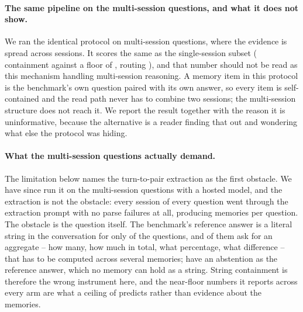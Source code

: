 \documentclass[11pt]{article}
\begin{document}
\paragraph{The same pipeline on the multi-session questions, and what it does not show.}
We ran the identical protocol on \tMultiSessN{} multi-session questions, where the evidence
is spread across sessions. It scores the same as the single-session subset
(\tMultiSessOn{} containment against a floor of \tMultiSessFrozen{}, routing
\tMultiSessRoute{}), and that number should not be read as this mechanism handling
multi-session reasoning. A memory item in this protocol is the benchmark's own question
paired with its own answer, so every item is self-contained and the read path never has to
combine two sessions; the multi-session structure does not reach it. We report the result
together with the reason it is uninformative, because the alternative is a reader finding
that out and wondering what else the protocol was hiding.

\paragraph{What the multi-session questions actually demand.} The limitation below names the
turn-to-pair extraction as the first obstacle. We have since run it on the \tMultiItems{}
multi-session questions with a hosted model, and the extraction is not the obstacle: every
session of every question went through the extraction prompt with no parse failures at all,
producing \tExtractMemoriesPerItem{} memories per question. The obstacle is the question
itself. The benchmark's reference answer is a literal string in the conversation for only
\tExtractCeiling{} of the \tMultiItems{} questions, and \tCompositionalShare{} of them ask for
an aggregate -- how many, how much in total, what percentage, what difference -- that has to
be computed across several memories; \tAbstainShare{} have an abstention as the reference
answer, which no memory can hold as a string. String containment is therefore the wrong
instrument here, and the near-floor numbers it reports across every arm are what a ceiling of
\tExtractCeiling{} predicts rather than evidence about the memories.
\end{document}
